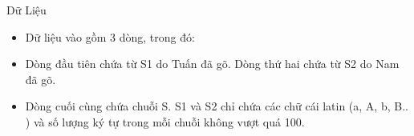 Dữ Liệu
\begin{itemize}
	\item     Dữ liệu vào gồm 3 dòng, trong đó:   
	\item     Dòng đầu tiên chứa từ S1 do Tuấn đã gõ. Dòng thứ hai chứa từ S2 do Nam đã gõ.   
	\item     Dòng cuối cùng chứa chuỗi S. S1 và S2 chỉ chứa các chữ cái latin (a, A, b, B.. ) và số lượng ký tự trong mỗi chuỗi không vượt quá 100.   
\end{itemize}